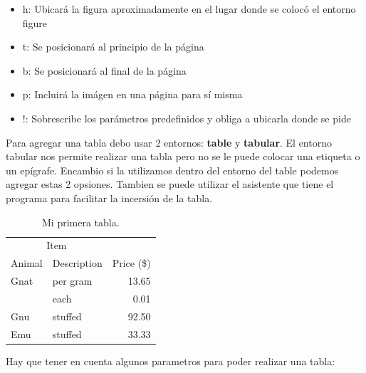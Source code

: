 \documentclass[a4paper,12pt]{article} %
\begin{document}
\begin{itemize}
\item{h: Ubicará la figura aproximadamente en el lugar donde se colocó el entorno figure}
\item{t: Se posicionará al principio de la página}
\item{b: Se posicionará al final de la página}
\item{p: Incluirá la imágen en una página para sí misma}
\item{!: Sobrescribe los parámetros predefinidos y obliga a ubicarla donde se pide}
\end{itemize}

Para agregar una tabla debo usar 2 entornos: \textbf{table} y \textbf{tabular}. El entorno tabular nos permite realizar una tabla pero no se le puede colocar una etiqueta o un epígrafe. Encambio si la utilizamos dentro del entorno del table podemos agregar estas 2 opsiones. Tambien se puede utilizar el asistente que tiene el programa para facilitar la incersión de la tabla.

\begin{table}[h] %
 \centering %
 \begin{tabular}{ll|r} %
  \hline
  \multicolumn{2}{c|}{Item} \\
  \cline{1-2}
  Animal    & Description & Price (\$) \\
  \hline
  Gnat      & per gram    & 13.65      \\
            & each        & 0.01       \\
  Gnu       & stuffed     & 92.50      \\
  Emu       & stuffed     & 33.33      \\
  \hline
 \end{tabular}
 \caption{Mi primera tabla.}
 \label{tabla1}
\end{table}
Hay que tener en cuenta algunos parametros para poder realizar una tabla:
\end{document}
